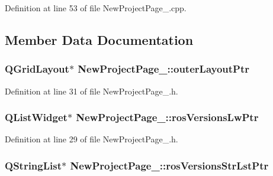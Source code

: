 Definition at line 53 of file New\-Project\-Page\-\_.\-cpp.



\subsection{Member Data Documentation}
\hypertarget{class_new_project_page__1_a809165b50ce35fa0812179209aba9294}{
\subsubsection[{outer\-Layout\-Ptr}]{\setlength{\rightskip}{0pt plus 5cm}Q\-Grid\-Layout$\ast$ New\-Project\-Page\-\_\-::outer\-Layout\-Ptr\hspace{0.3cm}{\ttfamily [private]}}}\label{class_new_project_page__1_a809165b50ce35fa0812179209aba9294}


Definition at line 31 of file New\-Project\-Page\-\_.\-h.

\hypertarget{class_new_project_page__1_a45bba5023ff9ebd180cc0be64367b37a}{
\subsubsection[{ros\-Versions\-Lw\-Ptr}]{\setlength{\rightskip}{0pt plus 5cm}Q\-List\-Widget$\ast$ New\-Project\-Page\-\_\-::ros\-Versions\-Lw\-Ptr\hspace{0.3cm}{\ttfamily [private]}}}\label{class_new_project_page__1_a45bba5023ff9ebd180cc0be64367b37a}


Definition at line 29 of file New\-Project\-Page\-\_.\-h.

\hypertarget{class_new_project_page__1_a63e7e74af698edd3d4b72ed84864ad87}{
\subsubsection[{ros\-Versions\-Str\-Lst\-Ptr}]{\setlength{\rightskip}{0pt plus 5cm}Q\-String\-List$\ast$ New\-Project\-Page\-\_\-::ros\-Versions\-Str\-Lst\-Ptr\hspace{0.3cm}{\ttfamily [private]}}}\label{class_new_project_page__1_a63e7e74af698edd3d4b72ed84864ad87}


